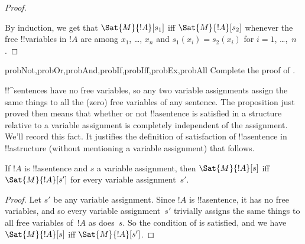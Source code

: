 \documentclass[../../../include/open-logic-section]{subfiles}
\begin{document}
\begin{proof}
\begin{enumerate}
\end{enumerate}
By induction, we get that $\Sat{M}{!A}[s_1]$ iff $\Sat{M}{!A}[s_2]$
whenever the free !!{variable}s in $!A$ are among $x_1$, \dots, $x_n$
and $s_1(x_i)=s_2(x_i)$ for $i = 1$, \dots,~$n$.
\end{proof}

\begin{probtag}{probNot,probOr,probAnd,probIf,probIff,probEx,probAll}
Complete the proof of .
\end{probtag}

\begin{explain}
!!^{sentence}s have no free variables, so any two variable assignments  
assign the same things to all the (zero) free variables of any
sentence. The proposition just proved then means that whether or not
!!a{sentence} is satisfied in a structure relative to a variable
assignment is completely independent of the assignment. We'll record
this fact. It justifies the definition of satisfaction of
!!a{sentence} in !!a{structure} (without mentioning a variable
assignment) that follows.
\end{explain}

\begin{cor}
If $!A$ is !!a{sentence} and $s$ a variable assignment, then
$\Sat{M}{!A}[s]$ iff $\Sat{M}{!A}[s']$ for every variable
assignment~$s'$.
\end{cor}

\begin{proof}
  Let $s'$ be any variable assignment. Since $!A$ is !!a{sentence}, it
  has no free variables, and so every variable assignment~$s'$
  trivially assigns the same things to all free variables of~$!A$ as
  does~$s$. So the condition of  is satisfied,
  and we have $\Sat{M}{!A}[s]$ iff $\Sat{M}{!A}[s']$.
\end{proof}
\end{document}
